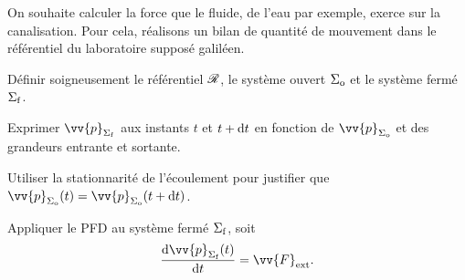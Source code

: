 \documentclass[12pt,fancy]{cours}
\begin{document}
 On souhaite calculer la force que le fluide, de l'eau par exemple, exerce sur la canalisation.
 Pour cela, réalisons un bilan de quantité de mouvement dans le référentiel du laboratoire supposé galiléen.
 \begin{methode}
 	\item Définir soigneusement le référentiel $\mathcal{R}$, le système ouvert $\Sigma_{\rm o}$ et le système fermé $\Sigma_{\rm f}$.
 	\item Exprimer $\vv{p}_{\Sf}$ aux instants $t$ et $t+\mathrm{d} t$ en fonction de $\vv{p}_{\So}$ et des grandeurs entrante et sortante.
	\item Utiliser la stationnarité de l'écoulement pour justifier que $\vv{p}_{\So}(t)=\vv{p}_{\So}(t+\d t)$.
 	\item Appliquer le PFD au système fermé $\Sigma_{\rm f}$, soit
	$$
\frac{\d \vv{p}_{\Sf}(t)}{\d t}=\vv{F}_{\rm{ext}}.
	$$
 \end{methode}
\end{document}

